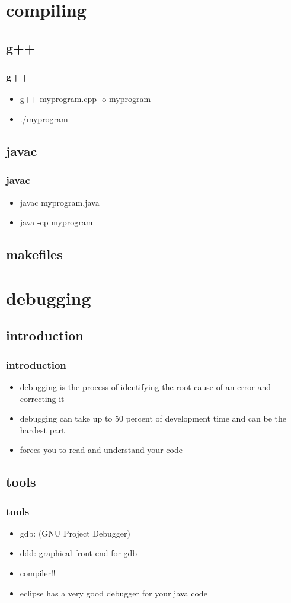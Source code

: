 \documentclass[hyperref={pdfpagelabels=false}]{beamer}
\begin{document}
\section{compiling}
	\subsection{g++}
		\frame
		{
		    \frametitle{g++}
		    \begin{itemize}
		    \item{g++ myprogram.cpp -o myprogram}
		    \item{./myprogram}
		    \end{itemize}
		}
	\subsection{javac}
		\frame
		{
		    \frametitle{javac}
		    \begin{itemize}
		    \item{javac myprogram.java}
		    \item{java -cp myprogram}
		    \end{itemize}
		}
	\subsection{makefiles}
\section{debugging}
	\subsection{introduction}
		\frame
		{
		    \frametitle{introduction}
		    \begin{itemize}
		    \item{debugging is the process of identifying the root cause of an error and correcting it}
		    \item{debugging can take up to 50 percent of development time and can be the hardest part}
		    \item{forces you to read and understand your code}
		    \end{itemize}
		}
	\subsection{tools}
		\frame
		{
		    \frametitle{tools}
		    \begin{itemize}
		    \item{gdb: (GNU Project Debugger)}
		    \item{ddd: graphical front end for gdb}
		    \item{compiler!!}
		    \item{eclipse has a very good debugger for your java code}
		    \end{itemize}
		}
\end{document}
